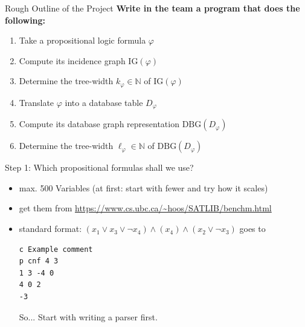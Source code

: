 \documentclass[]{beamer}
\newcommand{\IG}{\mathrm{IG}}
\newcommand{\DBG}{\mathrm{DBG}}
\begin{document}
\begin{frame}{Rough Outline of the Project}
\textbf{Write in the team a program that does the following:}
\begin{enumerate}
	\item<+-> Take a propositional logic formula $\varphi$
	\item<+-> Compute its incidence graph $\IG(\varphi)$
	\item<+-> Determine the tree-width $k_\varphi\in\mathbb N$ of $\IG(\varphi)$
	\item<+-> Translate $\varphi$ into a database table $D_\varphi$
	\item<+-> Compute its database graph representation $\DBG(D_\varphi)$
	\item<+-> Determine the tree-width $\ell_\varphi\in\mathbb N$ of $\DBG(D_\varphi)$
\end{enumerate}\bigskip

\end{frame}


\begin{frame}[fragile]{Step 1: Which propositional formulas shall we use?}
\begin{itemize}
	\item max. 500 Variables (at first: start with fewer and try how it scales)
	\item get them from \url{https://www.cs.ubc.ca/~hoos/SATLIB/benchm.html}
	\item standard format: $(x_1\lor x_3\lor \lnot x_4)\land (x_4)\land (x_2\lor \lnot x_3)$ goes to
\begin{center}
	\begin{verbatim}
c Example comment
p cnf 4 3
1 3 -4 0
4 0 2
-3	
	\end{verbatim}
\end{center}
\alert{So...} Start with writing a parser first.
\end{itemize}
\end{frame}
\end{document}
